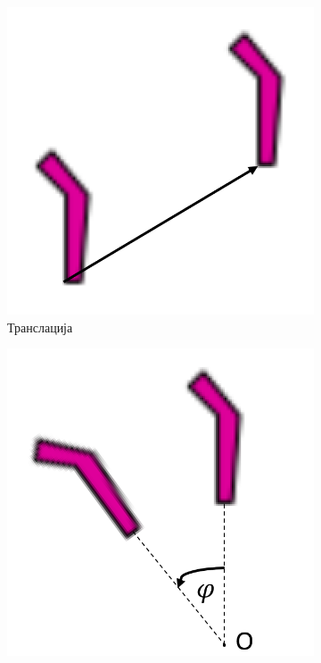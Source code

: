 \documentclass[12pt]{article}
\begin{document}
\begin{figure}[H]

  \begin{subfigure}[b]{0.24\textwidth}
    \includegraphics[width=.8\textwidth]{crtez_translacija.png}
    
    \caption{Транслација \newline      }
\label{fig:transl}
  \end{subfigure}
  \begin{subfigure}[b]{0.24\textwidth}
    \includegraphics[width=.8\textwidth]{crtez_rotacija.png}
    

\end{subfigure}
\end{figure}
\end{document}
